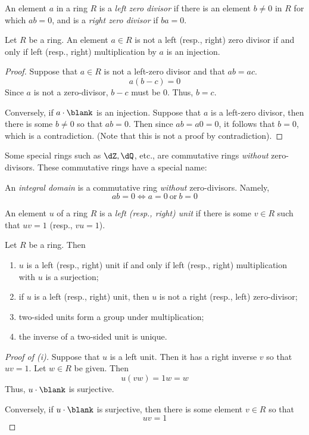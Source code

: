 \documentclass{amsart}
\begin{document}
\begin{defn}
  An element $a$ in a ring $R$ is a \emph{left zero divisor} if there is an element $b \ne 0$ in $R$ for which $ab = 0$, and is a \emph{right zero divisor} if $ba = 0$.
\end{defn}

\begin{lem}\label{lem:zero-divisor-characterization}
  Let $R$ be a ring.
  An element $a \in R$ is not a left (resp., right) zero divisor if and only if left (resp., right) multiplication by $a$ is an injection.
\end{lem}
\begin{proof}
  Suppose that $a \in R$ is not a left-zero divisor and that $ab = ac$.
  \[
    a(b - c) = 0
  \]
  Since $a$ is not a zero-divisor, $b - c$ must be $0$.
  Thus, $b = c$.

  Conversely, if $a \cdot \blank$ is an injection.
  Suppose that $a$ is a left-zero divisor, then there is some $b \ne 0$ so that $ab = 0$.
  Then since $ab = a0 = 0$, it follows that $b = 0$, which is a contradiction.
  (Note that this is not a proof by contradiction).
\end{proof}

Some special rings such as $\dZ, \dQ$, etc., are commutative rings \emph{without} zero-divisors.
These commutative rings have a special name:
\begin{defn}
  An \emph{integral domain} is a commutative ring \emph{without} zero-divisors.
  Namely,
  \[
    ab = 0 \iff a = 0~\text{or}~b = 0
  \]
\end{defn}

\begin{defn}
  An element $u$ of a ring $R$ is a \emph{left (resp., right) unit} if there is some $v \in R$ such that $uv = 1$ (resp., $vu = 1$).
\end{defn}

\begin{lem}\label{lem:unit-characterization}
  Let $R$ be a ring.
  Then
  \begin{enumerate}
  \item $u$ is a left (resp., right) unit if and only if left (resp., right) multiplication with $u$ is a surjection;
  \item if $u$ is a left (resp., right) unit, then $u$ is not a right (resp., left) zero-divisor;
  \item two-sided units form a group under multiplication;
  \item the inverse of a two-sided unit is unique.
  \end{enumerate}
\end{lem}
\begin{proof}[Proof of (i)]
  Suppose that $u$ is a left unit.
  Then it has a right inverse $v$ so that $uv = 1$.
  Let $w \in R$ be given.
  Then
  \[
    u(vw) = 1w = w
  \]
  Thus, $u \cdot \blank$ is surjective.
  
  Conversely, if $u \cdot \blank$ is surjective, then there is some element $v \in R$ so that
  \[
    uv = 1
  \]
\end{proof}
\end{document}
